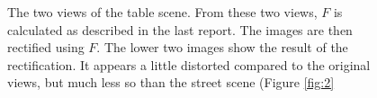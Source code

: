 \documentclass[11pt,a4paper]{article}
\begin{document}
\begin{figure}

\caption{The two views of the table scene. From these two views, $F$ is calculated as described in the last report. The images are then rectified using $F$. The lower two images show the result of the rectification. It appears a little distorted compared to the original views, but much less so than the street scene (Figure \ref{fig:2}}%
\label{fig:1}
\end{figure}
\end{document}
